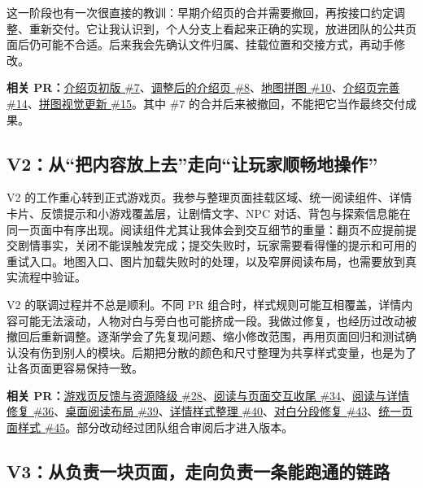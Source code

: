 这一阶段也有一次很直接的教训：早期介绍页的合并需要撤回，再按接口约定调整、重新交付。它让我认识到，个人分支上看起来正确的实现，放进团队的公共页面后仍可能不合适。后来我会先确认文件归属、挂载位置和交接方式，再动手修改。

\textbf{相关 PR：}\href{https://github.com/214notfound/jiedeng/pull/7}{介绍页初版 \#7}、\href{https://github.com/214notfound/jiedeng/pull/8}{调整后的介绍页 \#8}、\href{https://github.com/214notfound/jiedeng/pull/10}{地图拼图 \#10}、\href{https://github.com/214notfound/jiedeng/pull/14}{介绍页完善 \#14}、\href{https://github.com/214notfound/jiedeng/pull/15}{拼图视觉更新 \#15}。其中 \#7 的合并后来被撤回，不能把它当作最终交付成果。

\subsection{V2：从“把内容放上去”走向“让玩家顺畅地操作”}

V2 的工作重心转到正式游戏页。我参与整理页面挂载区域、统一阅读组件、详情卡片、反馈提示和小游戏覆盖层，让剧情文字、NPC 对话、背包与探索信息能在同一页面中有序出现。阅读组件尤其让我体会到交互细节的重量：翻页不应提前提交剧情事实，关闭不能误触发完成；提交失败时，玩家需要看得懂的提示和可用的重试入口。地图入口、图片加载失败时的处理，以及窄屏阅读布局，也需要放到真实流程中验证。

V2 的联调过程并不总是顺利。不同 PR 组合时，样式规则可能互相覆盖，详情内容可能无法滚动，人物对白与旁白也可能挤成一段。我做过修复，也经历过改动被撤回后重新调整。逐渐学会了先复现问题、缩小修改范围，再用页面回归和测试确认没有伤到别人的模块。后期把分散的颜色和尺寸整理为共享样式变量，也是为了让各页面更容易保持一致。

\textbf{相关 PR：}\href{https://github.com/214notfound/jiedeng/pull/28}{游戏页反馈与资源降级 \#28}、\href{https://github.com/214notfound/jiedeng/pull/34}{阅读与页面交互收尾 \#34}、\href{https://github.com/214notfound/jiedeng/pull/36}{阅读与详情修复 \#36}、\href{https://github.com/214notfound/jiedeng/pull/39}{桌面阅读布局 \#39}、\href{https://github.com/214notfound/jiedeng/pull/40}{详情样式整理 \#40}、\href{https://github.com/214notfound/jiedeng/pull/43}{对白分段修复 \#43}、\href{https://github.com/214notfound/jiedeng/pull/45}{统一页面样式 \#45}。部分改动经过团队组合审阅后才进入版本。

\subsection{V3：从负责一块页面，走向负责一条能跑通的链路}

